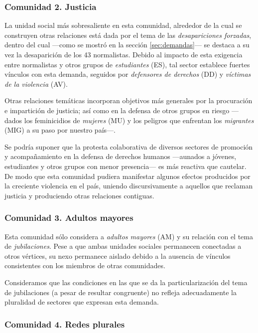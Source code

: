 \documentclass[letterpaper, 11pt]{book}
\theoremstyle{definition}
\theoremstyle{remark}
\begin{document}
\subsubsection{Comunidad 2. Justicia}
\label{subsubsec3:comunidad1}

La unidad social más sobresaliente en esta comunidad, alrededor de la cual se construyen otras relaciones está dada por el tema de las \emph{desapariciones forzadas}, dentro del cual ---como se mostró en la sección \ref{sec:demandas}--- se destaca a su vez la desaparición de los 43 normalistas. 
Debido al impacto de esta exigencia entre normalistas y otros grupos de \emph{estudiantes} (ES), tal sector establece fuertes vínculos con esta demanda, seguidos por \emph{defensores de derechos} (DD) y \emph{víctimas de la violencia} (AV). 


Otras relaciones temáticas incorporan objetivos más generales por la procuración e impartición de justicia; así como en la defensa de otros grupos en riesgo ---dados los feminicidios de \emph{mujeres} (MU) y los peligros que enfrentan los \emph{migrantes} (MIG) a su paso por nuestro país---. 


Se podría suponer que la protesta colaborativa de diversos sectores de promoción y acompañamiento en la defensa de derechos humanos ---aunados a jóvenes, estudiantes y otros grupos con menor presencia--- es más reactiva que cautelar. 
De modo que esta comunidad pudiera manifestar algunos efectos producidos por la creciente violencia en el país, uniendo discursivamente a aquellos que reclaman justicia y produciendo otras relaciones contiguas. 


\subsubsection{Comunidad 3. Adultos mayores}
\label{subsubsec3:comunidad3}

Esta comunidad sólo considera a \emph{adultos mayores} (AM) y su relación con el tema de \emph{jubilaciones}. 
Pese a que ambas unidades sociales permanecen conectadas a otros vértices, su nexo permanece aislado debido a la ausencia de vínculos consistentes con los miembros de otras comunidades. 

Consideramos que las condiciones en las que se da la particularización del tema de jubilaciones (a pesar de resultar congruente) no refleja adecuadamente la pluralidad de sectores que expresan esta demanda. 


\subsubsection{Comunidad 4. Redes plurales}
\label{subsubsec3:comunidad4}
\end{document}
